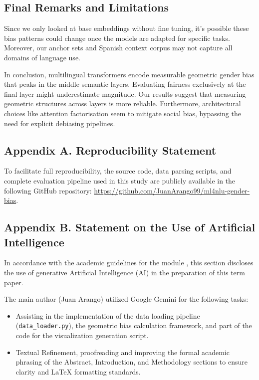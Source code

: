 \documentclass[english, a4paper, 11.5pt, twoside]{article}
\begin{document}
\subsection{Final Remarks and Limitations}
Since we only looked at base embeddings without fine tuning, it's possible these bias patterns could change once the models are adapted for specific tasks. Moreover, our anchor sets and Spanish context corpus may not capture all domains of language use. 

In conclusion, multilingual transformers encode measurable geometric gender bias that peaks in the middle semantic layers. Evaluating fairness exclusively at the final layer might underestimate magnitude. Our results suggest that measuring geometric structures across layers is more reliable. Furthermore, architectural choices like attention factorisation seem to mitigate social bias, bypassing the need for explicit debiasing pipelines.





\newpage
\printbibliography

\appendix


\subsection*{Appendix A. Reproducibility Statement}
To facilitate full reproducibility, the source code, data parsing scripts, and complete evaluation pipeline used in this study are publicly available in the following GitHub repository: \url{https://github.com/JuanArango99/ml4nlu-gender-bias}.

\subsection*{Appendix B. Statement on the Use of Artificial Intelligence}

In accordance with the academic guidelines for the module \textit{\moduletitle}, this section discloses the use of generative Artificial Intelligence (AI) in the preparation of this term paper.

The main author (Juan Arango) utilized Google Gemini for the following tasks:
\begin{itemize}
    \item Assisting in the implementation of the data loading pipeline (\texttt{data\_loader.py}), the geometric bias calculation framework, and part of the code for the visualization generation script.
    \item Textual Refinement, proofreading and improving the formal academic phrasing of the Abstract, Introduction, and Methodology sections to ensure clarity and LaTeX formatting standards.
\end{itemize}
\end{document}
